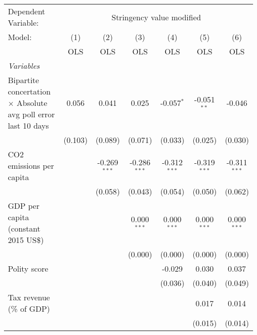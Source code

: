 
\begingroup
\centering
\begin{tabular}{lcccccc}
   \toprule
   Dependent Variable: & \multicolumn{6}{c}{Stringency value modified}\\
   Model:                                                                & (1)     & (2)            & (3)            & (4)            & (5)            & (6)\\  
                                                                         &  OLS    & OLS            & OLS            & OLS            & OLS            & OLS\\  
   \midrule
   \emph{Variables}\\
   Bipartite concertation $\times$ Absolute avg poll error last 10 days  & 0.056   & 0.041          & 0.025          & -0.057$^{*}$   & -0.051$^{**}$  & -0.046\\   
                                                                         & (0.103) & (0.089)        & (0.071)        & (0.033)        & (0.025)        & (0.030)\\   
   CO2 emissions per capita                                              &         & -0.269$^{***}$ & -0.286$^{***}$ & -0.312$^{***}$ & -0.319$^{***}$ & -0.311$^{***}$\\   
                                                                         &         & (0.058)        & (0.043)        & (0.054)        & (0.050)        & (0.062)\\   
   GDP per capita (constant 2015 US\$)                                   &         &                & 0.000$^{***}$  & 0.000$^{***}$  & 0.000$^{***}$  & 0.000$^{***}$\\   
                                                                         &         &                & (0.000)        & (0.000)        & (0.000)        & (0.000)\\   
   Polity score                                                          &         &                &                & -0.029         & 0.030          & 0.037\\   
                                                                         &         &                &                & (0.036)        & (0.040)        & (0.049)\\   
   Tax revenue (\% of GDP)                                               &         &                &                &                & 0.017          & 0.014\\   
                                                                         &         &                &                &                & (0.015)        & (0.014)\\   

\end{tabular}
